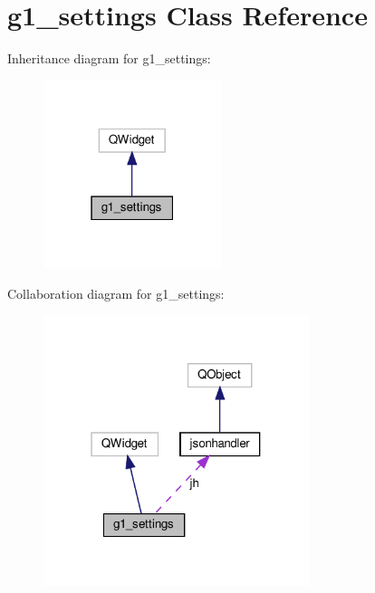 \hypertarget{classg1__settings}{}\section{g1\+\_\+settings Class Reference}
\label{classg1__settings}


Inheritance diagram for g1\+\_\+settings\+:
\nopagebreak
\begin{figure}[H]
\begin{center}
\leavevmode
\includegraphics[width=147pt]{classg1__settings__inherit__graph}
\end{center}
\end{figure}


Collaboration diagram for g1\+\_\+settings\+:
\nopagebreak
\begin{figure}[H]
\begin{center}
\leavevmode
\includegraphics[width=220pt]{classg1__settings__coll__graph}
\end{center}
\end{figure}
